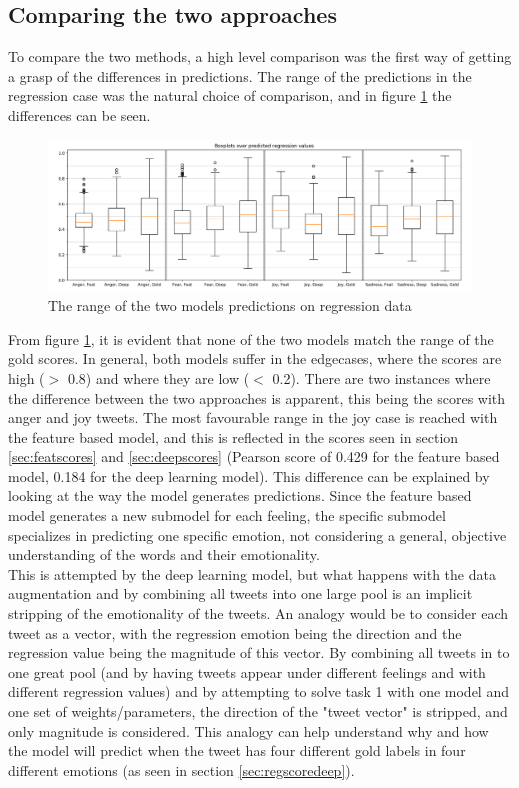 \subsection{Comparing the two approaches} \label{sec:comparison}
To compare the two methods, a high level comparison was the first way of getting a grasp of the differences in predictions. The range of the predictions in the regression case was the natural choice of comparison, and in figure \ref{fig:boxplot} the differences can be seen.
\begin{figure}[H]
    \centering
        \includegraphics[width=\textwidth]{pictures/boxplotmix.png}
        \caption{The range of the two models predictions on regression data}
        \label{fig:boxplot}
\end{figure}
From figure \ref{fig:boxplot}, it is evident that none of the two models match the range of the gold scores. In general, both models suffer in the edgecases, where the scores are high ($>$ 0.8) and where they are low ($<$ 0.2). There are two instances where the difference between the two approaches is apparent, this being the scores with anger and joy tweets. The most favourable range in the joy case is reached with the feature based model, and this is reflected in the scores seen in section \ref{sec:featscores} and \ref{sec:deepscores} (Pearson score of 0.429 for the feature based model, 0.184 for the deep learning model). This difference can be explained by looking at the way the model generates predictions. Since the feature based model generates a new submodel for each feeling, the specific  submodel specializes in predicting one specific emotion, not considering a general, objective understanding of the words and their emotionality.\\
This is attempted by the deep learning model, but what happens with the data augmentation and by combining all tweets into one large pool is an implicit stripping of the emotionality of the tweets. An analogy would be to consider each tweet as a vector, with the regression emotion being the direction and the regression value being the magnitude of this vector. By combining all tweets in to one great pool (and by having tweets appear under different feelings and with different regression values) and by attempting to solve task 1 with one model and one set of weights/parameters, the direction of the "tweet vector" is stripped, and only magnitude is considered. This analogy can help understand why and how the model will predict when the tweet has four different gold labels in four different emotions (as seen in section \ref{sec:regscoredeep}).\\
